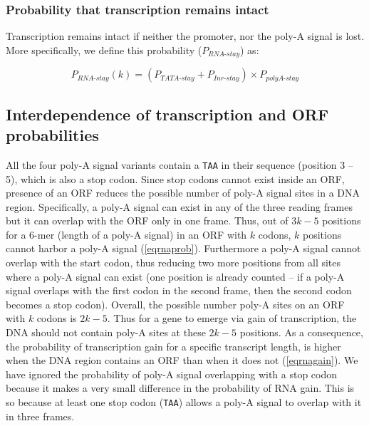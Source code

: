 \documentclass[12pt,a4paper]{article}
\begin{document}
\subsubsection{Probability that transcription remains intact}

Transcription remains intact if neither the promoter, nor the poly-A signal is lost. More specifically, we define this probability ($P_\textit{RNA-stay}$) as:

\begin{equation}
P_\textit{RNA-stay}(k) = (P_\textit{TATA-stay} + P_\textit{Inr-stay}) \times P_\textit{polyA-stay}
\label{eqrnastay}
\end{equation}

\subsection{Interdependence of transcription and ORF probabilities}

\label{rnaorfindependence}

All the four poly-A signal variants contain a \texttt{TAA} in their sequence (position 3 -- 5), which is also a stop codon. Since stop codons cannot exist inside an ORF, presence of an ORF reduces the possible number of poly-A signal sites in a DNA region. Specifically, a poly-A signal can exist in any of the three reading frames but it can overlap with the ORF only in one frame. Thus, out of $3k-5$ positions for a 6-mer (length of a poly-A signal) in an ORF with $k$ codons, $k$ positions cannot harbor a poly-A signal (\autoref{eqrnaprob}). Furthermore a poly-A signal cannot overlap with the start codon, thus reducing two more positions from all sites where a poly-A signal can exist (one position is already counted -- if a poly-A signal overlaps with the first codon in the second frame, then the second codon becomes a stop codon). Overall, the possible number poly-A sites on an ORF with $k$ codons is $2k-5$. Thus for a gene to emerge via gain of transcription, the DNA should not contain poly-A sites at these $2k-5$ positions. As a consequence, the probability of transcription gain for a specific transcript length, is higher when the DNA region contains an ORF than when it does not (\autoref{eqrnagain}). We have ignored the probability of poly-A signal overlapping with a stop codon because it makes a very small difference in the probability of RNA gain. This is so because at least one stop codon (\texttt{TAA}) allows a poly-A signal to overlap with it in three frames. 
\end{document}
